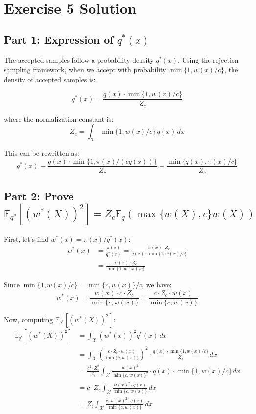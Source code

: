 \section*{Exercise 5 Solution}

\subsection*{Part 1: Expression of $q^*(x)$}

The accepted samples follow a probability density $q^*(x)$. Using the rejection sampling framework, when we accept with probability $\min\{1, w(x)/c\}$, the density of accepted samples is:

\begin{equation}
q^*(x) = \frac{q(x) \cdot \min\{1, w(x)/c\}}{Z_c}
\end{equation}

where the normalization constant is:
\begin{equation}
Z_c = \int_{\mathcal{X}} \min\{1, w(x)/c\} \, q(x) \, dx
\end{equation}

This can be rewritten as:
\begin{equation}
q^*(x) = \frac{q(x) \cdot \min\{1, \pi(x)/(cq(x))\}}{Z_c} = \frac{\min\{q(x), \pi(x)/c\}}{Z_c}
\end{equation}

\subsection*{Part 2: Prove $\mathbb{E}_{q^*}[(w^*(X))^2] = Z_c \mathbb{E}_q(\max\{w(X), c\}w(X))$}

First, let's find $w^*(x) = \pi(x)/q^*(x)$:
\begin{align}
w^*(x) &= \frac{\pi(x)}{q^*(x)} = \frac{\pi(x) \cdot Z_c}{q(x) \cdot \min\{1, w(x)/c\}} \\
&= \frac{w(x) \cdot Z_c}{\min\{1, w(x)/c\}}
\end{align}

Since $\min\{1, w(x)/c\} = \min\{c, w(x)\}/c$, we have:
\begin{equation}
w^*(x) = \frac{w(x) \cdot c \cdot Z_c}{\min\{c, w(x)\}} = \frac{c \cdot Z_c \cdot w(x)}{\min\{c, w(x)\}}
\end{equation}

Now, computing $\mathbb{E}_{q^*}[(w^*(X))^2]$:
\begin{align}
\mathbb{E}_{q^*}[(w^*(X))^2] &= \int_{\mathcal{X}} (w^*(x))^2 q^*(x) \, dx \\
&= \int_{\mathcal{X}} \left(\frac{c \cdot Z_c \cdot w(x)}{\min\{c, w(x)\}}\right)^2 \cdot \frac{q(x) \cdot \min\{1, w(x)/c\}}{Z_c} \, dx \\
&= \frac{c^2 \cdot Z_c^2}{Z_c} \int_{\mathcal{X}} \frac{w(x)^2}{\min\{c, w(x)\}^2} \cdot q(x) \cdot \min\{1, w(x)/c\} \, dx \\
&= c \cdot Z_c \int_{\mathcal{X}} \frac{w(x)^2 \cdot q(x)}{\min\{c, w(x)\}} \, dx \\
&= Z_c \int_{\mathcal{X}} \frac{c \cdot w(x)^2 \cdot q(x)}{\min\{c, w(x)\}} \, dx
\end{align}


